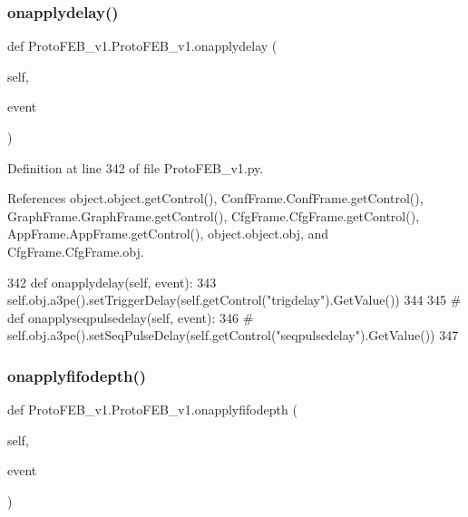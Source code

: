 \subsubsection{\texorpdfstring{onapplydelay()}{onapplydelay()}}
{\footnotesize\ttfamily def Proto\+F\+E\+B\+\_\+v1.\+Proto\+F\+E\+B\+\_\+v1.\+onapplydelay (\begin{DoxyParamCaption}\item[{}]{self,  }\item[{}]{event }\end{DoxyParamCaption})}



Definition at line 342 of file Proto\+F\+E\+B\+\_\+v1.\+py.



References object.\+object.\+get\+Control(), Conf\+Frame.\+Conf\+Frame.\+get\+Control(), Graph\+Frame.\+Graph\+Frame.\+get\+Control(), Cfg\+Frame.\+Cfg\+Frame.\+get\+Control(), App\+Frame.\+App\+Frame.\+get\+Control(), object.\+object.\+obj, and Cfg\+Frame.\+Cfg\+Frame.\+obj.


\begin{DoxyCode}
342     \textcolor{keyword}{def }onapplydelay(self, event):
343         self.obj.a3pe().setTriggerDelay(self.getControl(\textcolor{stringliteral}{"trigdelay"}).GetValue())
344 
345 \textcolor{comment}{#    def onapplyseqpulsedelay(self, event):}
346 \textcolor{comment}{#        self.obj.a3pe().setSeqPulseDelay(self.getControl("seqpulsedelay").GetValue())}
347 
\end{DoxyCode}
\mbox{\label{classProtoFEB__v1_1_1ProtoFEB__v1_affa41d5c50897be4f575bca04c73fd2b}} 
\subsubsection{\texorpdfstring{onapplyfifodepth()}{onapplyfifodepth()}}
{\footnotesize\ttfamily def Proto\+F\+E\+B\+\_\+v1.\+Proto\+F\+E\+B\+\_\+v1.\+onapplyfifodepth (\begin{DoxyParamCaption}\item[{}]{self,  }\item[{}]{event }\end{DoxyParamCaption})}




